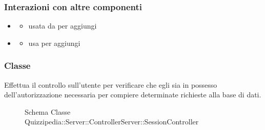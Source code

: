 \subsubsection{Interazioni con altre componenti}
\begin{itemize}
\item {}
\begin{itemize}
\item usata da  per aggiungi
\end{itemize}
\item {}
\begin{itemize}
\item usa  per aggiungi
\end{itemize}
\end{itemize}
\subsubsection{Classe }
Effettua il controllo sull'utente per verificare che egli sia in possesso dell'autorizzazione necessaria per compiere determinate richieste alla base di dati.
\begin{figure}[H]
\centering
\noindent{}
\caption[Schema Classe SessionController]{Schema Classe Quizzipedia::Server::ControllerServer::SessionController}
\end{figure}
